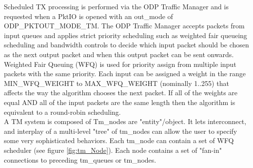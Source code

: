 Scheduled TX processing is performed via the ODP Traffic Manager and is requested when a PktIO is opened with an out\_mode of ODP\_PKTOUT\_MODE\_TM. 
The ODP Traffic Manager accepts packets from input queues and applies strict priority scheduling such as weighted fair queueing scheduling and bandwidth controls to decide which input packet should be chosen as the next output packet and when this output packet can be sent onwards.\\
Weighted Fair Queuing (WFQ) is used for priority assign from multiple input packets with the same priority. Each input can be assigned a weight in the range MIN\_WFQ\_WEIGHT to MAX\_WFQ\_WEIGHT (nominally 1..255) that affects the way the algorithm chooses the next packet. If all of the weights are equal AND all of the input packets are the same length then the algorithm is equivalent to a round-robin scheduling.\\

A TM system is composed of Tm\_nodes are "entity"/object. It lets interconnect, and interplay of a multi-level "tree" of tm\_nodes can allow the user to specify some very sophisticated behaviors. Each tm\_node can contain a set of WFQ scheduler (see figure \ref{fig:tm_Node}).  Each node contains a set of "fan-in" connections to preceding tm\_queues or tm\_nodes.
